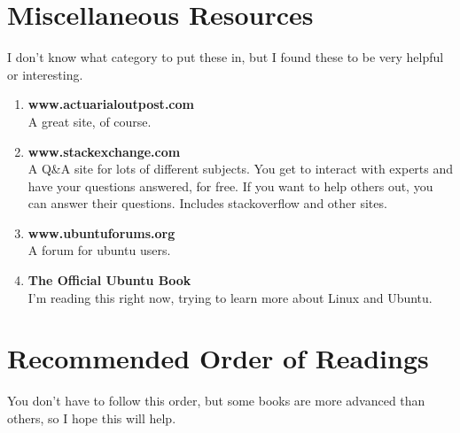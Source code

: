 \documentclass[oneside, titlepage]{article}
\begin{document}
\section{Miscellaneous Resources}
I don't know what category to put these in, but I found these to be very helpful or interesting.

\begin{enumerate}
\item{\bfseries www.actuarialoutpost.com}\\
A great site, of course.
\item{\bfseries www.stackexchange.com}\\
A Q\&A site for lots of different subjects. You get to interact with experts and have your questions answered, for free. If you want to help others out, you can answer their questions. Includes stackoverflow and other sites.
\item{\bfseries www.ubuntuforums.org}\\
A forum for ubuntu users.
\item{\bfseries The Official Ubuntu Book}\\
I'm reading this right now, trying to learn more about Linux and Ubuntu.
\end{enumerate}

\section{Recommended Order of Readings}
You don't have to follow this order, but some books are more advanced than others, so I hope this will help.
\end{document}
